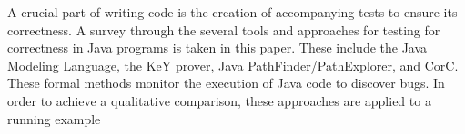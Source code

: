 A crucial part of writing code is the creation of accompanying tests to ensure
	 its correctness. A survey through the several tools and approaches for testing
	 for correctness in Java programs is taken in this paper. These include the
	 Java Modeling Language, the KeY prover, Java PathFinder/PathExplorer,
	 and CorC. These formal methods monitor the execution of Java code to discover
	 bugs. In order to achieve a qualitative comparison, these approaches are applied
	 to a running example